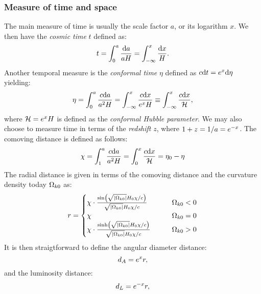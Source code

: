 \subsubsection{Measure of time and space}\label{sec:m1:measure_time_space}
    The main measure of time is usually the scale factor $a$, or its logarithm $x$. We then have the \textit{cosmic time} $t$ defined as:
    \begin{equation}\label{eq:m1:theory:measures:cosmic_time}
        t = \int_0^a\frac{\mathrm{d} a}{aH} = \int_{-\infty}^{x}\frac{\mathrm{d} x}{H}.
    \end{equation}
    Another temporal measure is the \textit{conformal time} $\eta$ defined as $c\mathrm{d} t = e^x\mathrm{d}\eta$ yielding:
    \begin{equation}\label{eq:m1:theory:measures:conformal_time}
        \eta = \int_0^a\frac{c\mathrm{d} a}{a^2H} = \int_{-\infty}^{x}\frac{c\mathrm{d} x}{e^xH} \equiv \int_{-\infty}^{x}\frac{c\mathrm{d} x}{\mathcal{H}},
    \end{equation}
    where $\mathcal{H}=e^xH$ is defined as the \textit{conformal Hubble parameter}. We may also choose to measure time in terms of the \textit{redshift} $z$, where $1+z = 1/a = e^{-x}$. The comoving distance is defined as follows:
    \begin{equation}
        \label{eq:m1:theory:measures:conformal ditance}
        \chi = \int_1^a\frac{c\mathrm{d} a}{a^2H} = \int_0^x\frac{c\mathrm{d} x}{\mathcal{H}} = \eta_0-\eta
    \end{equation}
    The radial distance is given in terms of the comoving distance and the curvature density today $\Omega_{k0}$ as:
    \begin{equation}\label{eq:m1:theory:measures:r_equation_def}
        r = \begin{cases}
            \chi \cdot \frac{\sin\left(\sqrt{\abs{\Omega_{k0}}}H_0\chi/c\right)}{\sqrt{\abs{\Omega_{k0}}}H_0\chi/c} \qquad &\Omega_{k0} < 0 \\
            \chi \qquad &\Omega_{k0} = 0 \\
            \chi \cdot \frac{\sinh\left(\sqrt{\abs{\Omega_{k0}}}H_0\chi/c\right)}{\sqrt{\abs{\Omega_{k0}}}H_0\chi/c} \qquad &\Omega_{k0} > 0
        \end{cases}
    \end{equation}
    It is then straigtforward to define the angular diameter distance:
    \begin{equation}\label{eq:m1:theory:measures:angular_distance_def}
        d_A = e^{x}r,
    \end{equation}
    and the luminosity distance:
    \begin{equation}\label{eq:m1:theory:measures:luminosity_distance}
        d_L = e^{-x}r,
    \end{equation}

